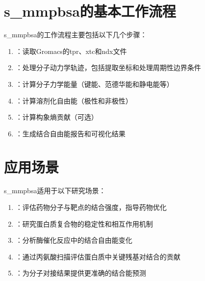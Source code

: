 \documentclass[letterpaper,10pt,english]{sphinxmanual}
\begin{document}
\section{s\_mmpbsa的基本工作流程}
\label{\detokenize{introduction:id4}}
\sphinxAtStartPar
s\_mmpbsa的工作流程主要包括以下几个步骤：
\begin{enumerate}
%
\item {} 
\sphinxAtStartPar
{}：读取Gromacs的tpr、xtc和ndx文件

\item {} 
\sphinxAtStartPar
{}：处理分子动力学轨迹，包括提取坐标和处理周期性边界条件

\item {} 
\sphinxAtStartPar
{}：计算分子力学能量（键能、范德华能和静电能等）

\item {} 
\sphinxAtStartPar
{}：计算溶剂化自由能（极性和非极性）

\item {} 
\sphinxAtStartPar
{}：计算构象熵贡献（可选）

\item {} 
\sphinxAtStartPar
{}：生成结合自由能报告和可视化结果

\end{enumerate}


\section{应用场景}
\label{\detokenize{introduction:id5}}
\sphinxAtStartPar
s\_mmpbsa适用于以下研究场景：
\begin{enumerate}
%
\item {} 
\sphinxAtStartPar
{}：评估药物分子与靶点的结合强度，指导药物优化

\item {} 
\sphinxAtStartPar
{}：研究蛋白质复合物的稳定性和相互作用机制

\item {} 
\sphinxAtStartPar
{}：分析酶催化反应中的结合自由能变化

\item {} 
\sphinxAtStartPar
{}：通过丙氨酸扫描评估蛋白质中关键残基对结合的贡献

\item {} 
\sphinxAtStartPar
{}：为分子对接结果提供更准确的结合能预测

\end{enumerate}
\end{document}
